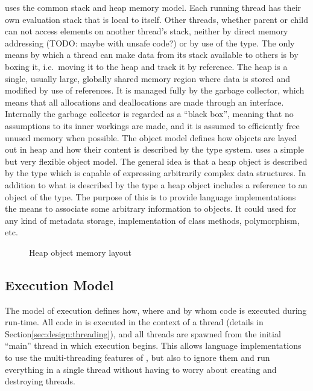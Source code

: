\thename{} uses the common stack and heap memory model. Each running thread has
their own evaluation stack that is local to itself. Other threads, whether
parent or child can not access elements on another thread's stack, neither by
direct memory addressing (TODO: maybe with unsafe code?) or by use of the
 type. The only means by which a thread can make data from
its stack available to others is by boxing it, i.e.~moving it to the heap and
track it by reference. The heap is a single, usually large, globally shared
memory region where data is stored and modified by use of references. It is
managed fully by the garbage collector, which means that all allocations and
deallocations are made through an interface. Internally the garbage collector is
regarded as a ``black box'', meaning that no assumptions to its inner workings
are made, and it is assumed to efficiently free unused memory when possible.
The object model defines how objects are layed out in heap and how their content
is described by the type system. \thename{} uses a simple but very flexible
object model. The general idea is that a heap object is described by the
 type which is capable of expressing arbitrarily complex data
structures. In addition to what is described by the type a heap object includes
a reference to an object of the  type. The purpose of this is to
provide language implementations the means to associate some arbitrary
information to objects. It could used for any kind of metadata storage,
implementation of class methods, polymorphism, etc.

\begin{figure}[H]
  \centering
  
  \caption{Heap object memory layout}
  \label{fig:design:heap-object-layout}
\end{figure}

\subsection{Execution Model}

The model of execution defines how, where and by whom code is executed during
run-time. All code in \thename{} is executed in the context of a thread (details
in Section\ref{sec:design:threading}), and all threads are spawned from the
initial ``main'' thread in which execution begins. This allows language
implementations to use the multi-threading features of \thename{}, but also to
ignore them and run everything in a single thread without having to worry about
creating and destroying threads.

